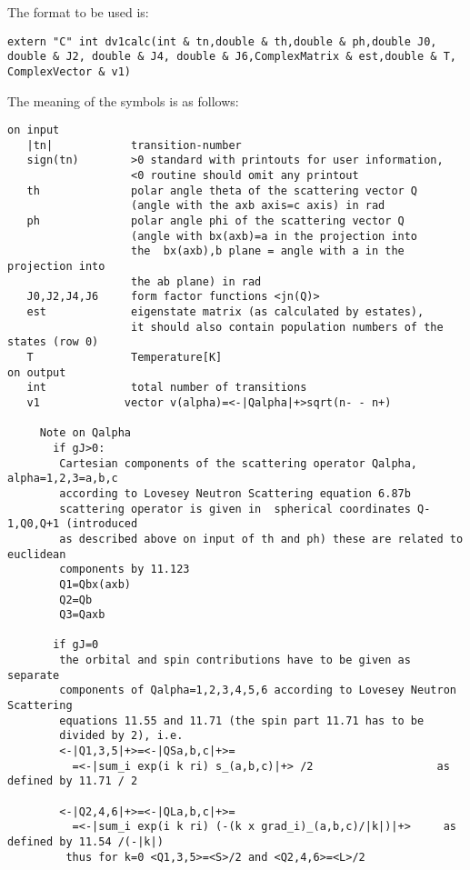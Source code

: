 The format to be used is:
{\footnotesize
\begin{verbatim}
extern "C" int dv1calc(int & tn,double & th,double & ph,double J0,
double & J2, double & J4, double & J6,ComplexMatrix & est,double & T,
ComplexVector & v1)
\end{verbatim}

The meaning of the symbols is as follows:

\begin{verbatim}
on input
   |tn|            transition-number  
   sign(tn)        >0 standard with printouts for user information, 
                   <0 routine should omit any printout
   th              polar angle theta of the scattering vector Q 
                   (angle with the axb axis=c axis) in rad
   ph              polar angle phi of the scattering vector Q 
                   (angle with bx(axb)=a in the projection into
                   the  bx(axb),b plane = angle with a in the projection into 
				   the ab plane) in rad
   J0,J2,J4,J6     form factor functions <jn(Q)>   
   est             eigenstate matrix (as calculated by estates),
                   it should also contain population numbers of the states (row 0)
   T               Temperature[K]
on output
   int             total number of transitions
   v1             vector v(alpha)=<-|Qalpha|+>sqrt(n- - n+)
                   
     Note on Qalpha
       if gJ>0:
        Cartesian components of the scattering operator Qalpha, alpha=1,2,3=a,b,c
        according to Lovesey Neutron Scattering equation 6.87b 
        scattering operator is given in  spherical coordinates Q-1,Q0,Q+1 (introduced
        as described above on input of th and ph) these are related to euclidean 
		components by 11.123
        Q1=Qbx(axb)
        Q2=Qb                         
        Q3=Qaxb    
                   
       if gJ=0 
        the orbital and spin contributions have to be given as separate 
		components of Qalpha=1,2,3,4,5,6 according to Lovesey Neutron Scattering 
		equations 11.55 and 11.71 (the spin part 11.71 has to be
        divided by 2), i.e.
        <-|Q1,3,5|+>=<-|QSa,b,c|+>=
          =<-|sum_i exp(i k ri) s_(a,b,c)|+> /2                   as defined by 11.71 / 2
				   
        <-|Q2,4,6|+>=<-|QLa,b,c|+>=
          =<-|sum_i exp(i k ri) (-(k x grad_i)_(a,b,c)/|k|)|+>     as defined by 11.54 /(-|k|)
	     thus for k=0 <Q1,3,5>=<S>/2 and <Q2,4,6>=<L>/2 
				
\end{verbatim}
}

